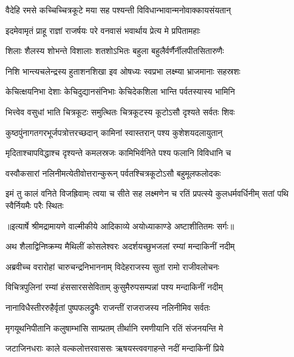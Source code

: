 \twolineshloka
{वैदेहि रमसे कच्चिच्चित्रकूटे मया सह}
{पश्यन्ती विविधान्भावान्मनोवाक्कायसंयतान्} %

\twolineshloka
{इदमेवामृतं प्राहू राज्ञां राजर्षयः परे}
{वनवासं भवार्थाय प्रेत्य मे प्रपितामहाः} %

\twolineshloka
{शिलाः शैलस्य शोभन्ते विशालाः शतशोऽभितः}
{बहुला बहुलैर्वर्णैर्नीलपीतसितारुणैः} %

\twolineshloka
{निशि भान्त्यचलेन्द्रस्य हुताशनशिखा इव}
{ओषध्यः स्वप्रभा लक्ष्म्या भ्राजमानाः सहस्रशः} %

\twolineshloka
{केचित्क्षयनिभा देशाः केचिदुद्यानसंनिभाः}
{केचिदेकशिला भान्ति पर्वतस्यास्य भामिनि} %

\twolineshloka
{भित्त्वेव वसुधां भाति चित्रकूटः समुत्थितः}
{चित्रकूटस्य कूटोऽसौ दृश्यते सर्वतः शिवः} %

\twolineshloka
{कुष्ठपुंनागतगरभूर्जपत्रोत्तरच्छदान्}
{कामिनां स्वास्तरान् पश्य कुशेशयदलायुतान्} %

\twolineshloka
{मृदिताश्चापविद्धाश्च दृश्यन्ते कमलस्रजः}
{कामिभिर्वनिते पश्य फलानि विविधानि च} %

\twolineshloka
{वस्वौकसारां नलिनीमत्येतीवोत्तरान्कुरून्}
{पर्वतश्चित्रकूटोऽसौ बहुमूलफलोदकः} %

\fourlineindentedshloka
{इमं तु कालं वनिते विजह्रिवाम्ः}
{त्वया च सीते सह लक्ष्मणेन च}
{रतिं प्रपत्स्ये कुलधर्मवर्धिनीम्}
{सतां पथि स्वैर्नियमैः परैः स्थितः} %


{॥इत्यार्षे श्रीमद्रामायणे वाल्मीकीये आदिकाव्ये अयोध्याकाण्डे अष्टाशीतितमः सर्गः॥}


\twolineshloka
{अथ शैलाद्विनिष्क्रम्य मैथिलीं कोसलेश्वरः}
{अदर्शयच्छुभजलां रम्यां मन्दाकिनीं नदीम्} %

\twolineshloka
{अब्रवीच्च वरारोहां चारुचन्द्रनिभाननाम्}
{विदेहराजस्य सुतां रामो राजीवलोचनः} %

\twolineshloka
{विचित्रपुलिनां रम्यां हंससारससेविताम्}
{कुसुमैरुपसम्पन्नां पश्य मन्दाकिनीं नदीम्} %

\twolineshloka
{नानाविधैस्तीररुहैर्वृतां पुष्पफलद्रुमैः}
{राजन्तीं राजराजस्य नलिनीमिव सर्वतः} %

\twolineshloka
{मृगयूथनिपीतानि कलुषाम्भांसि साम्प्रतम्}
{तीर्थानि रमणीयानि रतिं संजनयन्ति मे} %

\twolineshloka
{जटाजिनधराः काले वल्कलोत्तरवाससः}
{ऋषयस्त्ववगाहन्ते नदीं मन्दाकिनीं प्रिये} %

